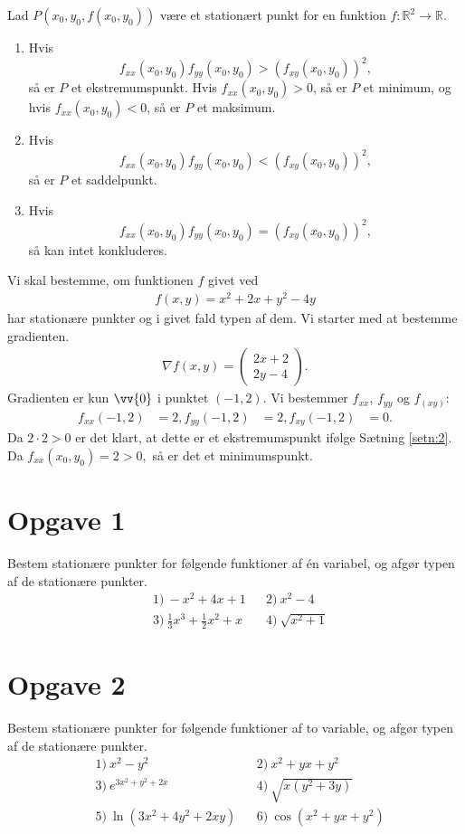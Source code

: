 \begin{setn}\label{setn:2}
	Lad $P(x_0,y_0,f(x_0,y_0))$ være et stationært punkt for en funktion $f:\mathbb{R}^2 \to \mathbb{R}$. 
	\begin{enumerate}[label=\roman*)]
		\item Hvis 
			$$f_{xx}(x_0,y_0)f_{yy}(x_0,y_0)>(f_{xy}(x_0,y_0))^2,$$
		så er $P$ et ekstremumspunkt. Hvis $f_{xx}(x_0,y_0)>0$, så er $P$ et minimum, og hvis 
		$f_{xx}(x_0,y_0) <0$, så er $P$ et maksimum. 
		\item Hvis 
			$$f_{xx}(x_0,y_0)f_{yy}(x_0,y_0)<(f_{xy}(x_0,y_0))^2,$$
		så er $P$ et saddelpunkt.
		\item Hvis 
			$$f_{xx}(x_0,y_0)f_{yy}(x_0,y_0)=(f_{xy}(x_0,y_0))^2,$$	
		så kan intet konkluderes.
	\end{enumerate}
\end{setn}

\begin{exa}
Vi skal bestemme, om funktionen $f$ givet ved
\begin{align*}
	f(x,y) = x^2+2x+y^2-4y
\end{align*}
har stationære punkter og i givet fald typen af dem. Vi starter med at bestemme gradienten.
\begin{align*}
	\nabla f(x,y) =
	\begin{pmatrix}
		2x+2 \\ 2y - 4		
	\end{pmatrix}.
\end{align*}
Gradienten er kun $\vv{0}$ i punktet $(-1,2)$. Vi bestemmer $f_{xx}$, $f_{yy}$ og $f_(xy)$:
\begin{align*}
	f_{xx}(-1,2) &= 2,
	f_{yy}(-1,2) &= 2,
	f_{xy}(-1,2) &= 0.
\end{align*} 
Da $2\cdot 2>0$ er det klart, at dette er et ekstremumspunkt ifølge Sætning \ref{setn:2}. Da $f_{xx}(x_0,y_0) = 2>0,$ så er det et minimumspunkt. 
\end{exa}

\section*{Opgave 1}
Bestem stationære punkter for følgende funktioner af én variabel, og afgør typen af de stationære punkter.
\begin{align*}
	&1) \  -x^2+4x+1  &&2) \ x^2-4   \\
	&3) \ \frac{1}{3}x^3+\frac{1}{2}x^2 + x  &&4) \ \sqrt{x^2+1}
\end{align*}

\section*{Opgave 2}
Bestem stationære punkter for følgende funktioner af to variable, og afgør typen af de stationære punkter. 
\begin{align*}
	&1)  \ x^2-y^2  &&2) \ x^2+yx+y^2   \\
	&3)  \ e^{3x^2+y^2+2x} &&4) \ \sqrt{x(y^2+3y)}  \\
	&5)  \ \ln(3x^2+4y^2+2xy)  &&6) \  \cos(x^2+yx+y^2)   \\
\end{align*}
